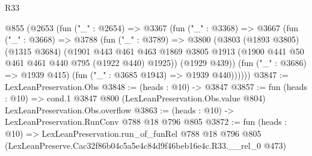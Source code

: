 \begin{lexlean}{R33}
\begin{coremodule}
  @855
    (@2653
      (fun ("_" : @2654) =>
      @3367
        (fun ("_" : @3368) =>
        @3667
          (fun ("_" : @3668) =>
          @3788
            (fun ("_" : @3789) =>
            @3800
              (@3803
                (@1893 @3805)
                (@1315 @3684)
                (@1901
                  @443
                  @461
                  @463
                  @1869
                  @3805
                  @1913
                  (@1900 @441 @50 @461 @461 @440 @795 (@1922 @440) @1925))
                (@1929 @439))
              (fun ("_" : @3686) => @1939 @415)
              (fun ("_" : @3685 @1943) => @1939 @440))))))
@3847 := LexLeanPreservation.Obs
@3848 := (heads : @10) -> @3847
@3857 := fun (heads : @10) =>
  cond.{1} @3847 @800 (LexLeanPreservation.Obs.value @804) LexLeanPreservation.Obs.overflow
@3863 := (heads : @10) -> LexLeanPreservation.RunConv @788 @18 @796 @805
@3872 := fun (heads : @10) =>
  LexLeanPreservation.run_of_funRel
    @788
    @18
    @796
    @805
    (LexLeanPreserve.Cac32f86b04c5a5e4c84d9f46beb16e4c.R33.__rel_0 @473)
\end{coremodule}
\end{lexlean}
